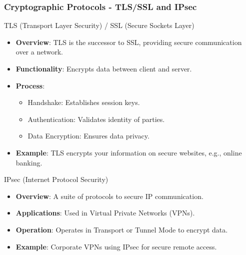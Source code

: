 \documentclass{beamer}
\begin{document}
\begin{frame}[fragile]
    \frametitle{Cryptographic Protocols - TLS/SSL and IPsec}
    
    \begin{block}{TLS (Transport Layer Security) / SSL (Secure Sockets Layer)}
        \begin{itemize}
            \item \textbf{Overview}: TLS is the successor to SSL, providing secure communication over a network.
            \item \textbf{Functionality}: Encrypts data between client and server.
            \item \textbf{Process}:
            \begin{itemize}
                \item Handshake: Establishes session keys.
                \item Authentication: Validates identity of parties.
                \item Data Encryption: Ensures data privacy.
            \end{itemize}
            \item \textbf{Example}: TLS encrypts your information on secure websites, e.g., online banking.
        \end{itemize}
    \end{block}

    \begin{block}{IPsec (Internet Protocol Security)}
        \begin{itemize}
            \item \textbf{Overview}: A suite of protocols to secure IP communication.
            \item \textbf{Applications}: Used in Virtual Private Networks (VPNs).
            \item \textbf{Operation}: Operates in Transport or Tunnel Mode to encrypt data.
            \item \textbf{Example}: Corporate VPNs using IPsec for secure remote access.
        \end{itemize}
    \end{block}
\end{frame}
\end{document}
